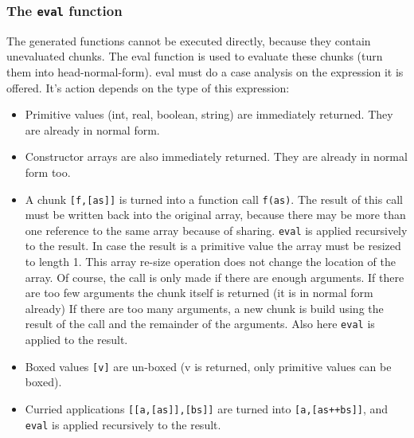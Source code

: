 \subsubsection{The \texttt{eval} function}
The generated \JS functions cannot be executed directly, because they contain unevaluated chunks.
The \textsf{eval} function is used to evaluate these chunks (turn them into head-normal-form).
\textsf{eval} must do a case analysis on the expression it is offered.
It's action depends on the type of  this expression:

\begin{itemize}
\item Primitive values (int, real, boolean, string) are immediately returned. They are already in normal form.
\item Constructor arrays  are also immediately returned. They are already in normal form too.
\item A chunk \texttt{[f,[as]]} is turned into a function call \texttt{f(as)}.
The result of this call must be written back into the original array, because there may be more than
one reference to the same array because of sharing. 
\texttt{eval} is applied recursively to the result.
In case the result is a primitive value the array must be resized to length 1.
This array re-size operation does not change the location of the array.  
Of course, the call is only made if there are enough arguments. 
If there are too few arguments the chunk itself is returned (it is in normal form already)
If there are too many arguments, a new chunk
is build using the result of the call and the remainder of the arguments.
Also here \texttt{eval} is applied to the result. 
\item Boxed values \texttt{[v]} are un-boxed (v is returned, only primitive values can be boxed).
\item Curried applications \texttt{[[a,[as]],[bs]]} are turned into  \texttt{[a,[as++bs]]}, and
\texttt{eval} is applied recursively to the result.
\end{itemize}

